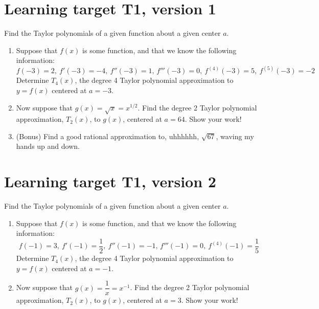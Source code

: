 




\everymath{\displaystyle}


\section{Learning target T1, version 1}

Find the Taylor polynomials of a given function about a given center $a$.

\hrulefill

\begin{enumerate}[leftmargin=15pt]
	\item Suppose that $f(x)$ is some function, and that we know the following information:
	\[ f(-3) = 2, \ f'(-3) = -4, \ f''(-3) = 1, \, f'''(-3) = 0, \ f^{(4)}(-3) = 5, \ f^{(5)}(-3) = -2 \]
	Determine $T_4(x)$, the degree 4 Taylor polynomial approximation to $y = f(x)$ centered at $a = -3$.

	\vfill

	\item Now suppose that $g(x) = \sqrt{x} = x^{1/2}$. Find the degree 2 Taylor polynomial approximation, $T_2(x)$, to $g(x)$, centered at $a=64$. Show your work!

	\vfill

	\item (Bonus) Find a good rational approximation to, uhhhhhh, $\sqrt{67}$, waving my hands up and down.

\end{enumerate}
\pagebreak
\section{Learning target T1, version 2}

Find the Taylor polynomials of a given function about a given center $a$.

\hrulefill

\begin{enumerate}[leftmargin=15pt]
	\item Suppose that $f(x)$ is some function, and that we know the following information:
	\[f(-1) = 3, \ f'(-1) = \frac{1}{2}, \ f''(-1) = -1, \, f'''(-1) = 0, \ f^{(4)}(-1) = \frac{1}{5} \]
	Determine $T_4(x)$, the degree 4 Taylor polynomial approximation to $y = f(x)$ centered at $a = -1$.

	\vfill

	\item Now suppose that $g(x) = \dfrac{1}{x} = x^{-1}$. Find the degree 2 Taylor polynomial approximation, $T_2(x)$, to $g(x)$, centered at $a=3$. Show your work!

	\vfill

\end{enumerate}

\pagebreak

